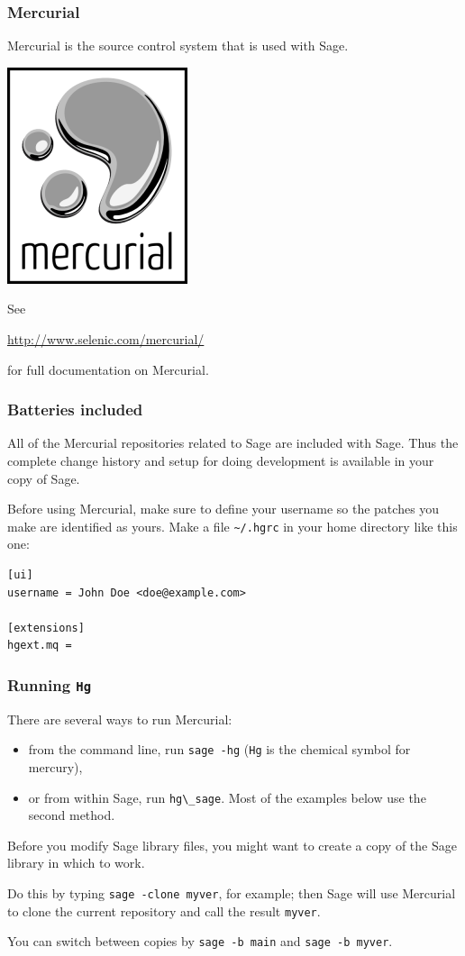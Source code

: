 \documentclass[11pt,blackandwhite]{beamer}
\newcommand{\code}{\lstinline}
\begin{document}
\begin{frame}
\frametitle{Mercurial}
Mercurial is the source control system that is used with Sage. 

\begin{center}
\includegraphics[height=0.2\textwidth]{mercurial-logo.png}
\end{center}

See
\begin{center}
\url{http://www.selenic.com/mercurial/}  
\end{center}
for full documentation on Mercurial.
\end{frame}

\begin{frame}[fragile]
\frametitle{Batteries included}
All of the Mercurial repositories related to Sage are included with
Sage. Thus the complete change history and setup for doing
development is available in your copy of Sage.

\vspace{1em}

Before using Mercurial, make sure to define your username so the
patches you make are identified as yours. Make a file \verb|~/.hgrc|
in your home directory like this one:

\begin{lstlisting}
[ui]
username = John Doe <doe@example.com>

[extensions]
hgext.mq =
\end{lstlisting}
\end{frame}

\begin{frame}
\frametitle{Running \code{Hg}}

There are several ways to run Mercurial: 
\begin{itemize}
 \item from the command line, run \code{sage -hg} (\code{Hg} is the chemical
symbol for mercury), 
 \item or from within Sage, run \code{hg\_sage}. Most of the examples below use
the second method.
\end{itemize}

Before you modify Sage library files, you might want to create a
copy of the Sage library in which to work. 

\vspace{1em}

Do this by typing
\code{sage -clone myver}, for example; then Sage will use
Mercurial to clone the current repository and call the result
\code{myver}.

\vspace{1em}

You can switch between copies by \code{sage -b main} and \code{sage -b myver}.
\end{frame}
\end{document}
